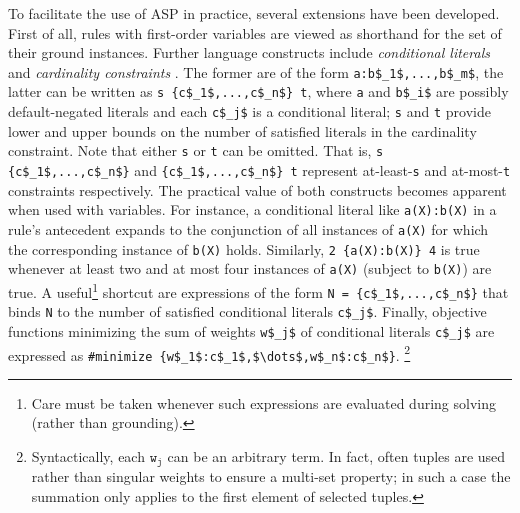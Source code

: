 To facilitate the use of ASP in practice, 
several extensions have been developed. 
First of all, rules with first-order variables are viewed as shorthand for the set of their ground instances.
Further language constructs include
\emph{conditional literals} and \emph{cardinality constraints} \citep{DBLP:journals/amai/Niemela99}.
The former are of the form
\lstinline[basicstyle=\ttfamily\normalsize,mathescape=true]{a:b$_1$,...,b$_m$},
the latter can be written as
\lstinline[basicstyle=\ttfamily\normalsize,mathescape=true]+s {c$_1$,...,c$_n$} t+,
where \lstinline[basicstyle=\ttfamily\normalsize]{a} and \lstinline[basicstyle=\ttfamily\normalsize,mathescape=true]{b$_i$} are possibly default-negated literals  %
and each \lstinline[basicstyle=\ttfamily\normalsize,mathescape=true]{c$_j$} is a conditional literal; %
\lstinline[basicstyle=\ttfamily\normalsize]{s} and \lstinline[basicstyle=\ttfamily\normalsize]{t} provide lower and upper bounds on the number of satisfied literals in the cardinality constraint.
%
Note that either
\lstinline[basicstyle=\ttfamily\normalsize]{s} or
\lstinline[basicstyle=\ttfamily\normalsize]{t} 
can be omitted.
That is, 
\lstinline[basicstyle=\ttfamily\normalsize,mathescape=true]+s {c$_1$,...,c$_n$}+ 
and 
\lstinline[basicstyle=\ttfamily\normalsize,mathescape=true]+{c$_1$,...,c$_n$} t+ 
represent at-least-\lstinline[basicstyle=\ttfamily\normalsize]{s}
and at-most-\lstinline[basicstyle=\ttfamily\normalsize]{t}
constraints respectively.
%
The practical value of both constructs becomes apparent when used with variables.
For instance, a conditional literal like
\lstinline[basicstyle=\ttfamily\normalsize,mathescape=true]{a(X):b(X)}
in a rule's antecedent expands to the conjunction of all instances of \lstinline[basicstyle=\ttfamily\normalsize]{a(X)} for which the corresponding instance of \lstinline[basicstyle=\ttfamily\normalsize]{b(X)} holds.
%
Similarly,
\lstinline[basicstyle=\ttfamily\normalsize,mathescape=true]+2 {a(X):b(X)} 4+
is true whenever at least two and at most four instances of \lstinline[basicstyle=\ttfamily\normalsize]{a(X)} (subject to \lstinline[basicstyle=\ttfamily\normalsize]{b(X)}) are true.
%
A useful\footnote{Care must be taken whenever such expressions are evaluated during solving (rather than grounding).} shortcut are expressions of the form
\lstinline[basicstyle=\ttfamily\normalsize,mathescape=true]+N = {c$_1$,...,c$_n$}+
that binds \lstinline[basicstyle=\ttfamily\normalsize]{N} to the number of satisfied conditional literals
\lstinline[basicstyle=\ttfamily\normalsize,mathescape=true]{c$_j$}.
%
Finally, objective functions minimizing the sum of weights
\lstinline[basicstyle=\ttfamily\normalsize,mathescape=true]{w$_j$}
of conditional literals 
\lstinline[basicstyle=\ttfamily\normalsize,mathescape=true]{c$_j$} are expressed as
\lstinline[basicstyle=\ttfamily\normalsize,mathescape=true]+#minimize {w$_1$:c$_1$,$\dots$,w$_n$:c$_n$}+.
\footnote{Syntactically, each $\mathtt{w_j}$ can be an arbitrary term.
In fact, often tuples are used rather than singular weights to ensure a multi-set property;
in such a case the summation only applies to the first element of selected tuples.}

